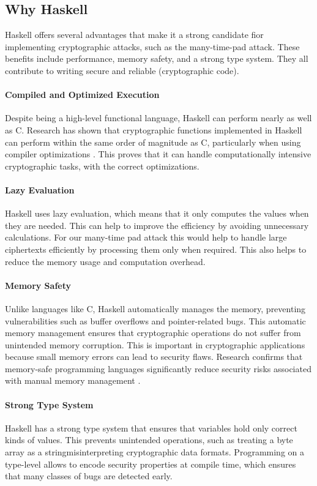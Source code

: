 \subsection{Why Haskell}
\label{sec:why_haskell}
Haskell offers several advantages that make it a strong candidate fior implementing cryptographic attacks, such as the many-time-pad attack. These benefits include performance, memory safety, and a strong type system. They all contribute to writing secure and reliable (cryptographic code). 

\paragraph{Compiled and Optimized Execution} Despite being a high-level functional language, Haskell can perform nearly as well as C. Research has shown that cryptographic functions implemented in Haskell can perform within the same order of magnitude as C, particularly when using compiler optimizations \cite{Ankner2013}. This proves that it can handle computationally intensive cryptographic tasks, with the correct optimizations.

\paragraph{Lazy Evaluation} Haskell uses lazy evaluation, which means that it only computes the values when they are needed. This can help to improve the efficiency by avoiding unnecessary calculations. For our many-time pad attack this would help to handle large ciphertexts efficiently by processing them only when required. This also helps to reduce the memory usage and computation overhead.

\paragraph{Memory Safety}
Unlike languages like C, Haskell automatically manages the memory, preventing vulnerabilities such as buffer overflows and pointer-related bugs. This automatic memory management ensures that cryptographic operations do not suffer from unintended memory corruption. This is important in cryptographic applications because small memory errors can lead to security flaws. Research confirms that memory-safe programming languages significantly reduce security risks associated with manual memory management \cite{Dwivedi2021}. 

\paragraph{Strong Type System}
Haskell has a strong type system that ensures that variables hold only correct kinds of values. This prevents unintended operations, such as treating a byte array as a stringmisinterpreting cryptographic data formats. Programming on a type-level allows to encode security properties at compile time, which ensures that many classes of bugs are detected early.


